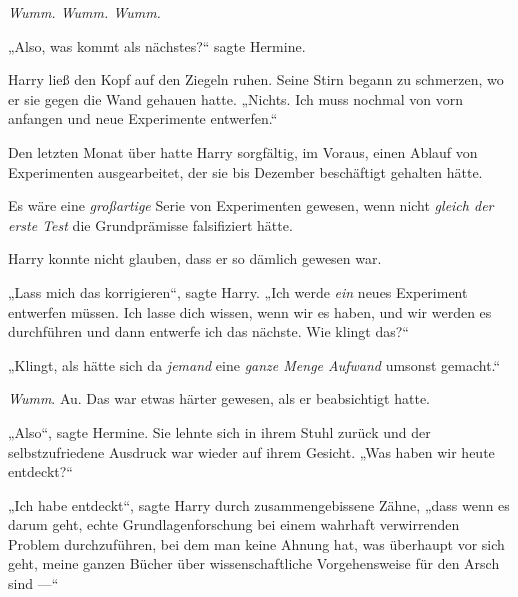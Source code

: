 \emph{Wumm. Wumm. Wumm.}

„Also, was kommt als nächstes?“ sagte Hermine.

Harry ließ den Kopf auf den Ziegeln ruhen. Seine Stirn begann zu schmerzen, wo er sie gegen die Wand gehauen hatte.
„Nichts. Ich muss nochmal von vorn anfangen und neue Experimente entwerfen.“

Den letzten Monat über hatte Harry sorgfältig, im Voraus, einen Ablauf von Experimenten ausgearbeitet, der sie bis Dezember beschäftigt gehalten hätte.

Es wäre eine \emph{großartige} Serie von Experimenten gewesen, wenn nicht \emph{gleich der erste Test} die Grundprämisse falsifiziert hätte.

Harry konnte nicht glauben, dass er so dämlich gewesen war.

„Lass mich das korrigieren“, sagte Harry.
„Ich werde \emph{ein} neues Experiment entwerfen müssen. Ich lasse dich wissen, wenn wir es haben, und wir werden es durchführen und dann entwerfe ich das nächste. Wie klingt das?“

„Klingt, als hätte sich da \emph{jemand} eine \emph{ganze Menge Aufwand} umsonst gemacht.“

\emph{Wumm}. Au. Das war etwas härter gewesen, als er beabsichtigt hatte.

„Also“, sagte Hermine. Sie lehnte sich in ihrem Stuhl zurück und der selbstzufriedene Ausdruck war wieder auf ihrem Gesicht.
„Was haben wir heute entdeckt?“

„Ich habe entdeckt“, sagte Harry durch zusammengebissene Zähne, „dass wenn es darum geht, echte Grundlagenforschung bei einem wahrhaft verwirrenden Problem durchzuführen, bei dem man keine Ahnung hat, was überhaupt vor sich geht, meine ganzen Bücher über wissenschaftliche Vorgehensweise für den Arsch sind —“

